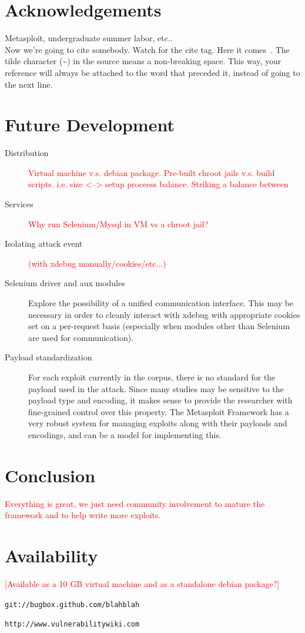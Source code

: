 \documentclass[letterpaper,twocolumn,10pt]{article}
\begin{document}
\section{Acknowledgements}

Metasploit, undergraduate summer labor, etc..\\
Now we're going to cite somebody.  Watch for the cite tag.
Here it comes~.  The tilde character (\~{})
in the source means a non-breaking space.  This way, your reference will
always be attached to the word that preceded it, instead of going to the
next line.

\section{Future Development}
 \begin{description}
   \item[Distribution]
     \textcolor{red}{Virtual machine v.s. debian package. Pre-built chroot jails v.s. build scripts.
     i.e. size <--> setup proceess balance. Striking a balance between}
   \item[Services]
     \textcolor{red}{Why run Selenium/Mysql in VM vs a chroot jail?}
   \item[Isolating attack event]
     \textcolor{red}{(with xdebug manually/cookies/etc...)}   
   \item[Selenium driver and aux modules]
   Explore the possibility of a unified communication interface. This may be necessary in order to cleanly interact with xdebug with appropriate cookies set on a per-request basis (especially when modules other than Selenium are used for communication).
   \item[Payload standardization]
For each exploit currently in the corpus, there is no standard for the payload used in the attack. Since many studies may be sensitive to the payload type and encoding, it makes sense to provide the researcher with fine-grained control over this property. The Metasploit Framework has a very robust system for managing exploits along with their payloads and encodings, and can be a model for implementing this.
 \end{description}


\section{Conclusion}
\textcolor{red}{
Everything is great, we just need community involvement to mature the framework and to help write more exploits.
}
\section{Availability}
\textcolor{red}{
[Available as a 10 GB virtual machine and as a standalone debian package?]
}
\begin{center}
{\tt git://bugbox.github.com/blahblah}
\end{center}

\begin{center}
{\tt http://www.vulnerabilitywiki.com}
\end{center}

{\footnotesize 
}


\theendnotes
\end{document}
